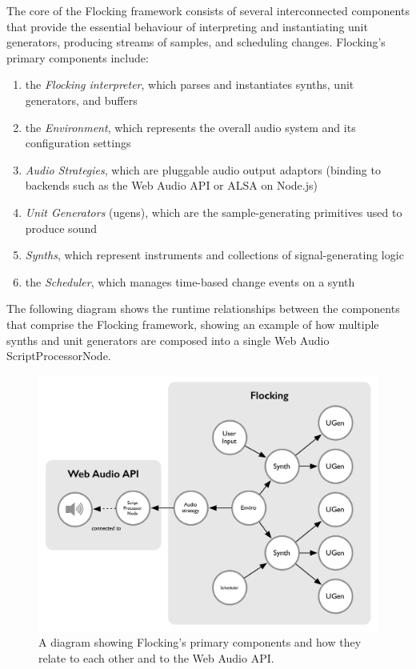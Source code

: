 \documentclass{article}
\begin{document}
The core of the Flocking framework consists of several interconnected components that provide the essential behaviour of interpreting and instantiating unit generators, producing streams of samples, and scheduling changes. Flocking's primary components include:

\begin{enumerate}
\item the {\it Flocking interpreter}, which parses and instantiates synths, unit generators, and buffers
\item the {\it Environment}, which represents the overall audio system and its configuration settings
\item {\it Audio Strategies}, which are pluggable audio output adaptors (binding to backends such as the Web Audio API or ALSA on Node.js)
\item {\it Unit Generators} (ugens), which are the sample-generating primitives used to produce sound
\item {\it Synths}, which represent instruments and collections of signal-generating logic
\item the {\it Scheduler}, which manages time-based change events on a synth
\end{enumerate}

The following diagram shows the runtime relationships between the components that comprise the Flocking framework, showing an example of how multiple synths and unit generators are composed into a single Web Audio ScriptProcessorNode.

\begin{figure}[h]
\centering
\includegraphics[width=0.9\columnwidth]{images/flocking-component-architecture.png}
\caption{ A diagram showing Flocking's primary components and how they relate to each other and to the Web Audio API.\label{fig:architecture}}
\end{figure}
\end{document}
